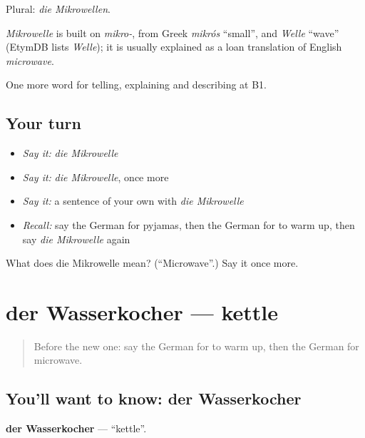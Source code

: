Plural: \emph{die Mikrowellen}.

\begin{cousinweb}
\emph{Mikrowelle} is built on \emph{mikro-}, from Greek \emph{mikrós} \textquotedblleft{}small\textquotedblright{}, and \emph{Welle} \textquotedblleft{}wave\textquotedblright{} (EtymDB lists \emph{Welle}); it is usually explained as a loan translation of English \emph{microwave}.
\end{cousinweb}

\begin{grammarlens}[title={What you've built}]
One more word for telling, explaining and describing at B1.
\end{grammarlens}

\subsection*{Your turn}
\begin{itemize}
\raggedright
  \item \emph{Say it:} \emph{die Mikrowelle}
  \item \emph{Say it:} \emph{die Mikrowelle}, once more
  \item \emph{Say it:} a sentence of your own with \emph{die Mikrowelle}
  \item \emph{Recall:} say the German for pyjamas, then the German for to warm up, then say \emph{die Mikrowelle} again
\end{itemize}

\begin{tcolorbox}[breakable,colback=teal!4,colframe=teal!35!black,title={Before you move on}]
What does die Mikrowelle mean? (\textquotedblleft{}Microwave\textquotedblright{}.) Say it once more.
\end{tcolorbox}
\section[der Wasserkocher]{der Wasserkocher — kettle}

\label{lesson:GE-C531-wasserkocher}



\begin{quote}
Before the new one: say the German for to warm up, then the German for microwave.
\end{quote}

\subsection*{You'll want to know: der Wasserkocher}
\textbf{der Wasserkocher} — \textquotedblleft{}kettle\textquotedblright{}.


